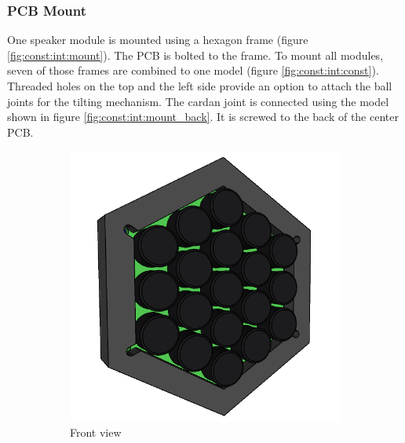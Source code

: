 \subsubsection*{PCB Mount}
%
One speaker module is mounted using a hexagon frame (figure \ref{fig:const:int:mount}). The PCB is bolted to the frame. To mount all modules, seven of those frames are combined to one model (figure \ref{fig:const:int:const}). Threaded holes on the top and the left side provide an option to attach the ball joints for the tilting mechanism. The cardan joint is connected using the model shown in figure \ref{fig:const:int:mount_back}. It is screwed to the back of the center PCB.
%
\begin{figure}[ht]
  \begin{subfigure}[b]{0.49\textwidth}
    \includegraphics[width=\textwidth]{src/assets/pictures/construction/pcb_plate.png}
    \caption{Front view}
    \label{fig:const:int:mount_front}
  \end{subfigure}
  \hfill
  \begin{subfigure}[b]{0.49\textwidth}

\end{subfigure}
\end{figure}
